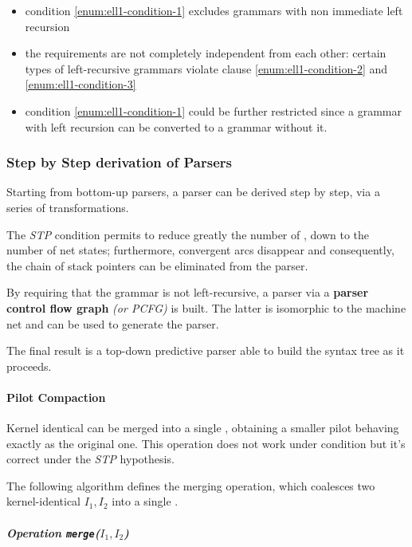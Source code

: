 \documentclass[english]{article}
\begin{document}
\begin{itemize}
  \item condition \ref{enum:ell1-condition-1} excludes grammars with non immediate left recursion
  \item the requirements are not completely independent from each other: certain types of left-recursive grammars violate clause \ref{enum:ell1-condition-2} and \ref{enum:ell1-condition-3}
  \item condition \ref{enum:ell1-condition-1} could be further restricted since a grammar with left recursion can be converted to a grammar without it.
\end{itemize}

\subsubsection[Step by Step derivation of ELL(1) Parsers]{Step by Step derivation of \ello Parsers}

Starting from bottom-up parsers, a \ello parser can be derived step by step, via a series of transformations.

The \textit{STP} condition permits to reduce greatly the number of \mstates, down to the number of net states;
furthermore, convergent arcs disappear and consequently, the chain of stack pointers can be eliminated from the parser.

By requiring that the grammar is not left-recursive, a parser via a \textbf{parser control flow graph} \textit{(or PCFG)} is built.
The latter is isomorphic to the machine net and can be used to generate the parser.

The final result is a top-down predictive parser able to build the syntax tree as it proceeds.

\paragraph{Pilot Compaction}

Kernel identical \mstates can be merged into a single \mstate, obtaining a smaller pilot behaving exactly as the original one.
This operation does not work under \elro condition but it's correct under the \textit{STP} hypothesis.

The following algorithm defines the merging operation, which coalesces two kernel-identical \mstates \(I_1, I_2\) into a single \mstate.

\subparagraph*{Operation \texttt{merge}(\(I_1, I_2\))}
\end{document}
